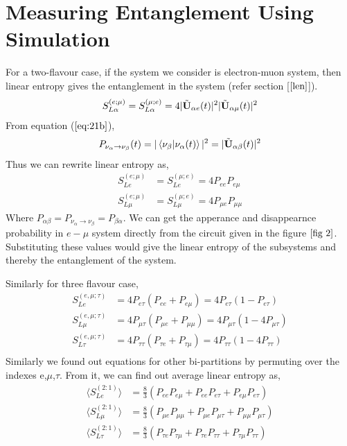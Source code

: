 \documentclass[12pt,a4paper]{report}
\begin{document}
\section{Measuring Entanglement Using Simulation}
For a two-flavour case, if the system we consider is electron-muon system, then linear entropy gives the entanglement in the system (refer section [$\ref{len}$]).
\begin{equation*}
    S_{L\alpha}^{(e;\mu)} = S_{L\alpha}^{(\mu;e)}=4|\Tilde{\textbf{U}}_{\alpha e}(t)|^{2}|\Tilde{\textbf{U}}_{\alpha \mu}(t)|^{2}
\end{equation*}
From equation ($\ref{eq:21b}$),
\begin{equation*}
P_{\nu_{\alpha} \rightarrow \nu_{\beta}}(t) = |\braket{\nu_{\beta}|\nu_{\alpha}(t)}|^{2} = |\Tilde{\textbf{U}}_{\alpha\beta}(t)|^{2}
\end{equation*}
Thus we can rewrite linear entropy as,
\begin{equation}
\begin{split}
\label{eq:27}
    S_{Le}^{(e;\mu)}& = S_{Le}^{(\mu;e)}=4 P_{ee}P_{e\mu}\\
    S_{L\mu}^{(e;\mu)}& = S_{L\mu}^{(\mu;e)}=4 P_{\mu e}P_{\mu\mu}
\end{split}
\end{equation}
Where $P_{\alpha \beta} = P_{\nu_{\alpha}\rightarrow\nu_{\beta}} = P_{\beta \alpha}$. We can get the apperance and disappearnce probability in $e-\mu$ system directly from the circuit given in the figure $\ref{fig 2}$. Substituting these values would give the linear entropy of the subsystems and thereby the entanglement of the system.\par
Similarly for three flavour case, 
\begin{equation}
\begin{split}
 S_{Le}^{(e,\mu;\tau)} &=4P_{e\tau}(P_{ee}+P_{e\mu})=4P_{e\tau}(1-P_{e\tau})\\
 S_{L\mu}^{(e,\mu;\tau)}& =4P_{\mu\tau}(P_{\mu e}+P_{\mu \mu})=4P_{\mu\tau}(1-4P_{\mu\tau})\\
 S_{L\tau}^{(e,\mu;\tau)}& =4P_{\tau\tau}(P_{\tau e}+P_{\tau \mu})=4P_{\tau\tau}(1-4P_{\tau\tau})\\
 \end{split}
\end{equation}
Similarly we found out equations for other bi-partitions by permuting over the indexes e,$\mu$,$\tau$.
From it, we can find out average linear entropy as,
\begin{equation}
\label{eq:28}
\begin{split}
    \langle S_{L e}^{(2:1)}\rangle &= \frac{8}{3}(P_{ee}P_{e\mu}+P_{ee}P_{e\tau}+P_{e\mu}P_{e\tau})\\
    \langle S_{L \mu}^{(2:1)}\rangle &= \frac{8}{3}(P_{\mu e}P_{\mu \mu}+P_{\mu e}P_{\mu\tau}+P_{\mu\mu}P_{\mu\tau})\\  
    \langle S_{L \tau}^{(2:1)}\rangle &= \frac{8}{3}(P_{\tau e}P_{\tau \mu}+P_{\tau e}P_{\tau\tau}+P_{\tau\mu}P_{\tau\tau})\\
    \end{split}
\end{equation}
\end{document}
